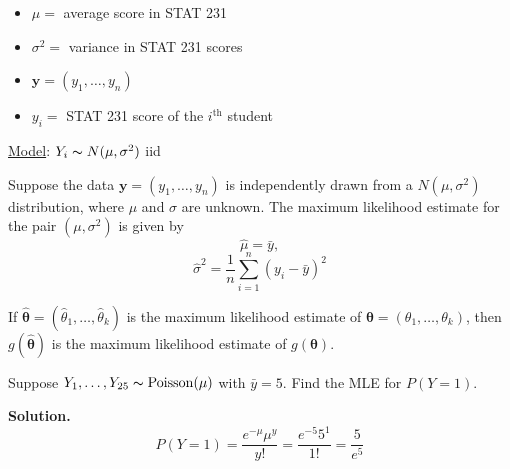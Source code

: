 \begin{exbox}
    \begin{example} $ \; $
        \begin{itemize}
            \item $ \mu = $ average score in STAT 231
            \item $ \sigma^2= $ variance in STAT 231 scores
            \item $ \bm{y}=(y_1,\ldots ,y_n) $
            \item $ y_i= $ STAT 231 score of the $ i^{\text{th}} $ student
        \end{itemize}
        \underline{Model}: $ Y_i \thicksim N(\mu,\sigma^2) $ iid
    \end{example}
\end{exbox}

\begin{thmbox}
    \begin{prop}
        Suppose the data $ \bm{y}=(y_1,\ldots ,y_n) $ is independently
        drawn from a $ N(\mu,\sigma^2) $ distribution,
        where $ \mu $ and $ \sigma $ are unknown. The maximum
        likelihood estimate for the pair $ (\mu,\sigma^2) $ is given by
        \[ \hat{\mu}=\bar{y}, \]
        \[ \hat{\sigma}^2=\frac{1}{n} \sum\limits_{i=1}^{n} \left( y_i-\bar{y} \right)^2 \]
    \end{prop}
\end{thmbox}

\begin{thmbox}
    \begin{theorem}
        If $ \hat{\bm{\theta}}=(\hat{\theta}_1,\ldots ,\hat{\theta}_k) $ is the maximum likelihood
        estimate of $ \bm{\theta}=(\theta_1,\ldots ,\theta_k) $, then
        $ g(\bm{\hat{\theta}}) $ is the maximum likelihood estimate of $ g(\bm{\theta}) $.
    \end{theorem}
\end{thmbox}

\begin{exbox}
    \begin{example}
        Suppose $ Y_1,\ldots ,Y_{25} \thicksim \operatorname{Poisson}(\mu) $ with $ \bar{y}=5 $.
        Find the MLE for $ P(Y=1) $.
        
        \textbf{Solution.}
        \[ P(Y=1)=\frac{e^{-\mu}\mu^y}{y!}=\frac{e^{-5}5^1}{1!}=\frac{5}{e^5} \]
    \end{example}
\end{exbox}
